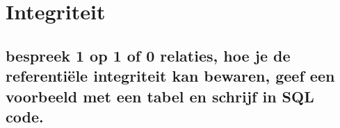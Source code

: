 \newpage

\section{Integriteit}

\subsection{bespreek 1 op 1 of 0 relaties, hoe je de referentiële integriteit kan bewaren, geef een voorbeeld met een tabel en schrijf in SQL code.}
